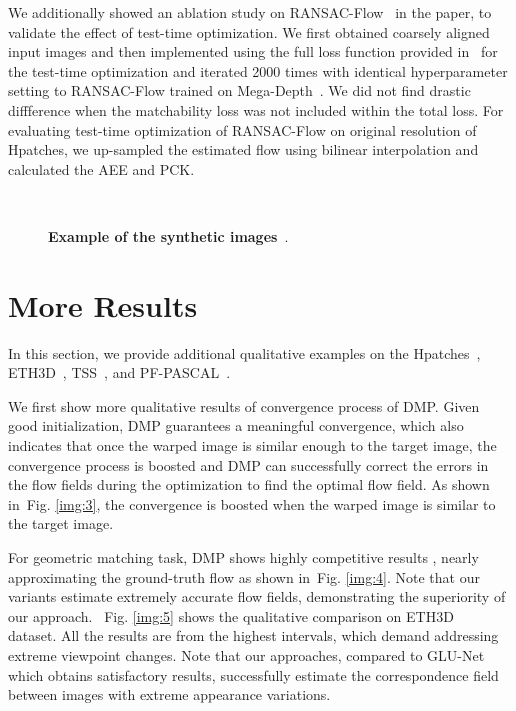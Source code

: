 \documentclass[10pt,twocolumn,letterpaper]{article}
\newcommand{\figref}[1]{Fig. \ref{#1}}
\begin{document}
We additionally showed an ablation study on RANSAC-Flow~\cite{shen2020ransac} in the paper, to validate the effect of test-time optimization. We first obtained coarsely aligned input images and then implemented using the full loss function provided in~\cite{shen2020ransac} for the test-time optimization and iterated 2000 times with identical hyperparameter setting to RANSAC-Flow trained on Mega-Depth~\cite{li2018megadepth}. We did not find drastic diffference when the matchability loss was not included within the total loss. For evaluating test-time optimization of RANSAC-Flow on original resolution of Hpatches, we up-sampled the estimated flow using bilinear interpolation and calculated the AEE and PCK. 
\begin{figure}[t]
	\centering
	\renewcommand{\thesubfigure}{}
	\hfill
	\hfill
	\hfill
	\hfill\\
	\caption{\textbf{Example of the synthetic images}~\cite{rocco2017convolutional}.\label{synth} }\vspace{-10pt}
\end{figure}
\section{More Results}\label{sec:4}
In this section, we provide additional qualitative examples on the Hpatches~\cite{balntas2017hpatches}, ETH3D~\cite{schops2017multi}, TSS~\cite{taniai2016joint}, and PF-PASCAL~\cite{ham2016proposal}.

We first show more qualitative results of convergence process of DMP. Given good initialization, DMP guarantees a meaningful convergence, which also indicates that once the warped image is similar enough to the target image, the convergence process is boosted and DMP can successfully correct the errors in the flow fields during the optimization to find the optimal flow field. As shown in~\figref{img:3}, the convergence is boosted when the warped image is similar to the target image.

For geometric matching task, DMP shows highly competitive results , nearly approximating the ground-truth flow as shown in~\figref{img:4}. Note that our variants estimate extremely accurate flow fields, demonstrating the superiority of our approach. ~\figref{img:5} shows the qualitative comparison on ETH3D~\cite{schops2017multi} dataset. All the results are from the highest intervals, which demand addressing extreme viewpoint changes. Note that our approaches, compared to GLU-Net~\cite{truong2020glu} which obtains satisfactory results, successfully estimate the correspondence field between images with extreme appearance variations.
\end{document}
